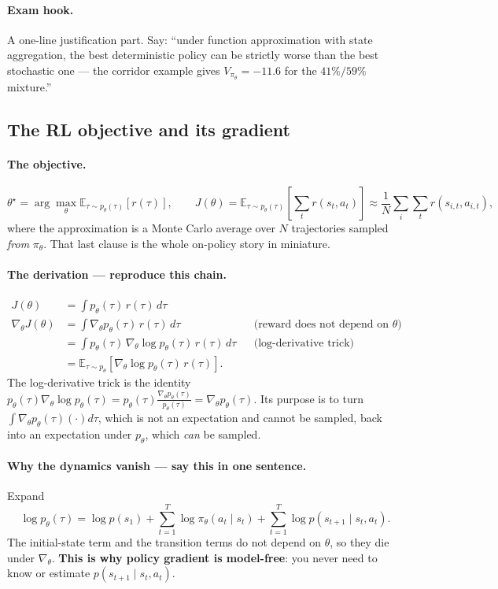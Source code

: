 \documentclass[11pt,a4paper]{article}
\begin{document}
\paragraph{Exam hook.} A one-line justification part. Say: ``under function
approximation with state aggregation, the best deterministic policy can be
strictly worse than the best stochastic one --- the corridor example gives
$V_{\pi_\theta}=-11.6$ for the $41\%/59\%$ mixture.''

\subsection{The RL objective and its gradient}

\paragraph{The objective.}
\[
\theta^\star=\arg\max_\theta \mathbb E_{\tau\sim p_\theta(\tau)}[r(\tau)],
\qquad
J(\theta)=\mathbb E_{\tau\sim p_\theta(\tau)}\!\left[\sum_t r(s_t,a_t)\right]
\approx \frac1N\sum_i\sum_t r(s_{i,t},a_{i,t}),
\]
where the approximation is a Monte Carlo average over $N$ trajectories sampled
\emph{from} $\pi_\theta$. That last clause is the whole on-policy story in
miniature.

\paragraph{The derivation --- reproduce this chain.}
\begin{align}
J(\theta) &= \int p_\theta(\tau)\,r(\tau)\,d\tau \\
\nabla_\theta J(\theta) &= \int \nabla_\theta p_\theta(\tau)\,r(\tau)\,d\tau
&&\text{(reward does not depend on $\theta$)}\\
&= \int p_\theta(\tau)\,\nabla_\theta \log p_\theta(\tau)\,r(\tau)\,d\tau
&&\text{(log-derivative trick)}\\
&= \mathbb E_{\tau\sim p_\theta}\!\left[\nabla_\theta\log p_\theta(\tau)\,r(\tau)\right].
\end{align}
The log-derivative trick is the identity
$p_\theta(\tau)\nabla_\theta\log p_\theta(\tau)
= p_\theta(\tau)\frac{\nabla_\theta p_\theta(\tau)}{p_\theta(\tau)}
= \nabla_\theta p_\theta(\tau)$.
Its purpose is to turn $\int \nabla_\theta p_\theta(\tau)(\cdot)d\tau$, which
is not an expectation and cannot be sampled, back into an expectation under
$p_\theta$, which \emph{can} be sampled.

\paragraph{Why the dynamics vanish --- say this in one sentence.} Expand
\[
\log p_\theta(\tau)=\log p(s_1)+\sum_{t=1}^T \log\pi_\theta(a_t\mid s_t)
+\sum_{t=1}^T \log p(s_{t+1}\mid s_t,a_t).
\]
The initial-state term and the transition terms do not depend on $\theta$, so
they die under $\nabla_\theta$. \textbf{This is why policy gradient is
model-free}: you never need to know or estimate $p(s_{t+1}\mid s_t,a_t)$.
\end{document}
